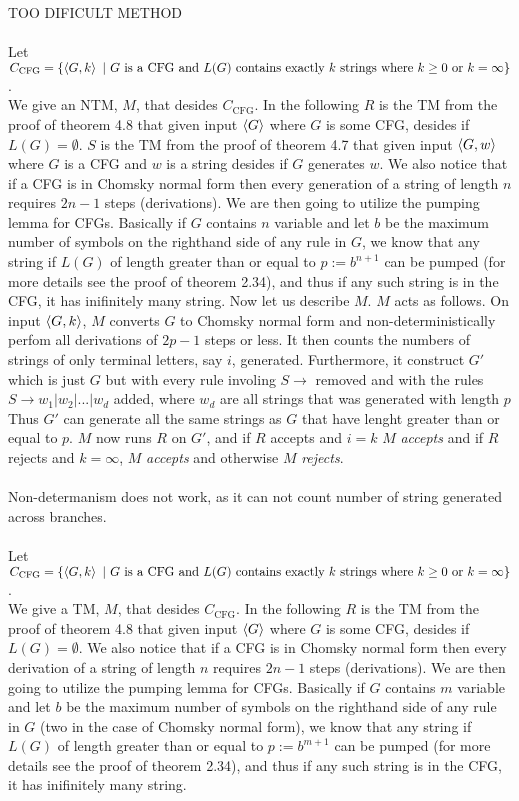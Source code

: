 \documentclass[a4paper,11pt]{article}
\numberwithin{equation}{section}
\begin{document}
TOO DIFICULT METHOD
\\
\\
Let $ C_{\text{CFG}}=\{\braket{G,k}\ \vert\ G\text{ is a CFG and }L(G)\text{ contains exactly }k\text{ strings where }k\geq0\text{ or }k=\infty\} $.\\
We give an NTM, $ M $, that desides $ C_{\text{CFG}} $. In the following $ R $ is the TM from the proof of theorem 4.8 that given input $ \braket{G} $ where $ G $ is some CFG, desides if $ L(G)=\emptyset $. $ S $ is the  TM from the proof of theorem 4.7 that given input $ \braket{G,w} $ where $ G $ is a CFG and $ w $ is a string desides if $ G $ generates $ w $. We also notice that if a CFG is in Chomsky normal form then every generation of a string of length $ n $ requires $ 2n-1 $ steps (derivations). We are then going to utilize the pumping lemma for CFGs. Basically if $ G $ contains $ n $ variable and let $ b $ be the maximum number of symbols on the righthand side of any rule in $ G $, we know that any string if $ L(G) $ of length greater than or equal to $ p:=b^{n+1} $ can be pumped (for more details see the proof of theorem 2.34), and thus if any such string is in the CFG, it has inifinitely many string.
Now let us describe $ M $.
$ M $ acts as follows. On input $ \braket{G,k} $, $ M $ converts $ G $ to Chomsky normal form and non-deterministically perfom all derivations of $ 2p-1 $ steps or less. It then counts the numbers of strings of only terminal letters, say $ i $, generated. Furthermore, it construct $ G' $ which is just $ G $ but with every rule involing $ S\to $ removed and with the rules $ S\to w_1|w_2|...|w_d $ added, where $ w_d $ are all strings that was generated with length $ p $ Thus $ G' $ can generate all the same strings as $ G $ that have lenght greater than or equal to $ p $. $ M $ now runs $ R $ on $ G' $, and if $ R $ accepts and $ i=k $ $ M $ \emph{accepts} and if $ R $ rejects and $ k=\infty $, $ M $ \emph{accepts} and otherwise $ M $ \emph{rejects}.
\\
\\
Non-determanism does not work, as it can not count number of string generated across branches.
\\
\\
Let $ C_{\text{CFG}}=\{\braket{G,k}\ \vert\ G\text{ is a CFG and }L(G)\text{ contains exactly }k\text{ strings where }k\geq0\text{ or }k=\infty\} $.\\
We give a TM, $ M $, that desides $ C_{\text{CFG}} $. In the following $ R $ is the TM from the proof of theorem 4.8 that given input $ \braket{G} $ where $ G $ is some CFG, desides if $ L(G)=\emptyset $. We also notice that if a CFG is in Chomsky normal form then every derivation of a string of length $ n $ requires $ 2n-1 $ steps (derivations). We are then going to utilize the pumping lemma for CFGs. Basically if $ G $ contains $ m $ variable and let $ b $ be the maximum number of symbols on the righthand side of any rule in $ G $ (two in the case of Chomsky normal form), we know that any string if $ L(G) $ of length greater than or equal to $ p:=b^{m+1} $ can be pumped (for more details see the proof of theorem 2.34), and thus if any such string is in the CFG, it has inifinitely many string.
\end{document}
